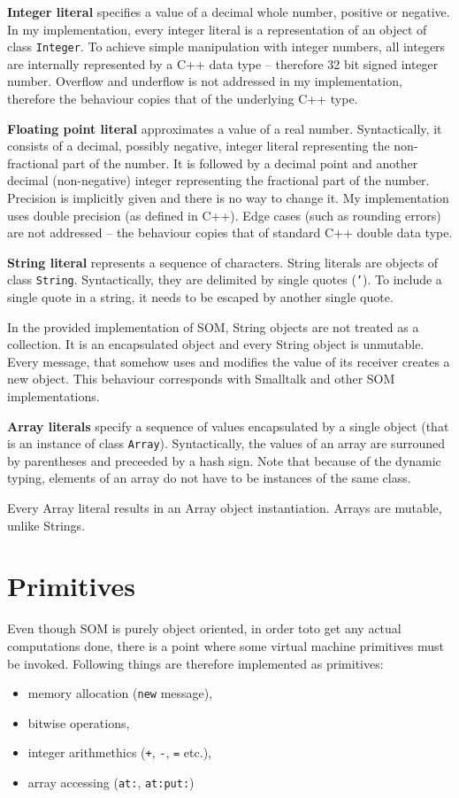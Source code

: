 \documentclass[thesis=M,english]{FITthesis}[2019/12/23]
\begin{document}
\textbf{Integer literal} specifies a value of a decimal whole number, positive or negative.
In my implementation, every integer literal is a representation of an object of class \texttt{Integer}. 
To achieve simple manipulation with integer numbers, all integers are internally represented by a C++
data type \texttt{} -- therefore 32 bit signed integer number. Overflow and underflow is not
addressed in my implementation, therefore the behaviour copies that of the underlying C++ type.

\textbf{Floating point literal} approximates a value of a real number. Syntactically, it consists of
a decimal, possibly negative, integer literal representing the non-fractional part of the number. It is
followed by a decimal point and another decimal (non-negative) integer representing the fractional part
of the number. Precision is implicitly given and there is no way to change it. My implementation uses
double precision (as defined in C++). Edge cases (such as rounding errors) are not addressed -- the behaviour
copies that of standard C++ double data type.

\textbf{String literal} represents a sequence of characters. String literals are objects of class \texttt{String}.
Syntactically, they are delimited by single quotes (\texttt{'}). To include a single quote in a string, it needs
to be escaped by another single quote.

In the provided implementation of SOM, String objects are not treated as a collection. It is an encapsulated object
and every String object is unmutable. Every message, that somehow uses and modifies the value of its receiver
creates a new object. This behaviour corresponds with Smalltalk and other SOM implementations.

\textbf{Array literals} specify a sequence of values encapsulated by a single object (that is an instance of class
\texttt{Array}). Syntactically, the values of an array are surrouned by parentheses and preceeded by a hash sign.
Note that because of the dynamic typing, elements of an array do not have to be instances of the same class.

Every Array literal results in an Array object instantiation. Arrays are mutable, unlike Strings.

\section{Primitives}
Even though SOM is purely object oriented, in order toto get any actual computations done, there is a point where
some virtual machine primitives must be invoked. Following things are therefore implemented as primitives:
\begin{itemize}
	\item memory allocation (\texttt{new} message),
	\item bitwise operations,
	\item integer arithmethics (\texttt{+}, \texttt{-}, \texttt{=} etc.),
	\item array accessing (\texttt{at:}, \texttt{at:put:})
\end{itemize}
\end{document}
